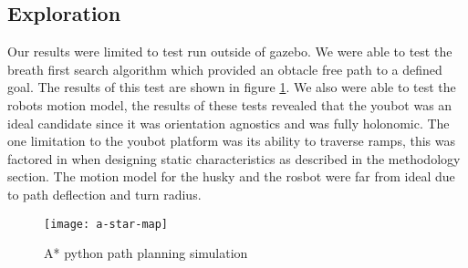 \subsection{Exploration}
Our results were limited to test run outside of gazebo. We were able to test the breath first search algorithm which provided an obtacle free path to a defined goal. The results of this test are shown in figure \ref{fig:a-star-map}. We also were able to test the robots motion model, the results of these tests revealed that the youbot was an ideal candidate since it was orientation agnostics and was fully holonomic. The one limitation to the youbot platform was its ability to traverse ramps, this was factored in when designing static characteristics as described in the methodology section. The motion model for the husky and the rosbot were far from ideal due to path deflection and turn radius.

\begin{figure}[H]
  \centering
    \texttt{[image: a-star-map]}
  \caption{A* python path planning simulation} \label{fig:a-star-map}
\end{figure}
